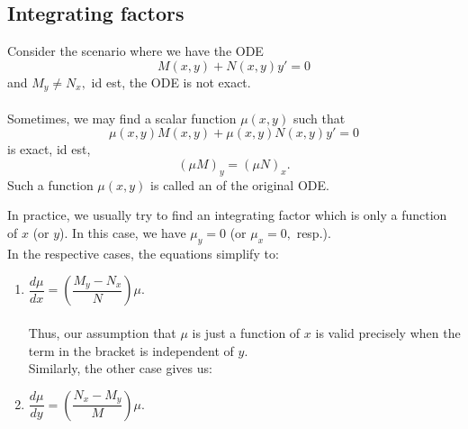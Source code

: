 \subsection{Integrating factors}
\begin{defn}
Consider the scenario where we have the ODE
\[M(x, y) + N(x, y)y' = 0\]
and $M_y \neq N_x,$ id est, the ODE is not exact.\\~\\
Sometimes, we may find a scalar function $\mu(x, y)$ such that
\[\mu(x, y)M(x, y) + \mu(x, y)N(x, y)y' = 0\]
is exact, id est, 
\[(\mu M)_y = (\mu N)_x.\]
Such a function $\mu(x, y)$ is called an  of the original ODE.
\end{defn}

\begin{mdframed}[style=boxstyle, frametitle={Actually solving it}]
In practice, we usually try to find an integrating factor which is only a function of $x$ (or $y$). In this case, we have $\mu_y = 0$ (or $\mu_x = 0,$ resp.).\\
In the respective cases, the equations simplify to:
\begin{enumerate}[leftmargin=*]
	\item $\dfrac{d \mu}{dx} = \left(\dfrac{M_y - N_x}{N}\right)\mu.$\\~\\
	Thus, our assumption that $\mu$ is just a function of $x$ is valid precisely when the term in the bracket is independent of $y.$\\
	Similarly, the other case gives us:
	\item $\dfrac{d \mu}{dy} = \left(\dfrac{N_x - M_y}{M}\right)\mu.$
\end{enumerate}
\end{mdframed}
